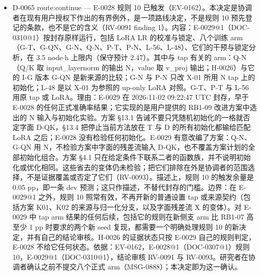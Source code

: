 \documentclass[11pt]{article}
\begin{document}
\begin{itemize}
\item D-0065 route:continue --- E-0028 规则 10 已触发（EV-0162）。本决定是协调者在现有用户授权下作出的有界例外，是一项路线决定，不是规则 10 预先登记的条款，也不是它的含义（RV-0091 finding 1）。内容：E-0029@1（DOC-0310@1）按封存原样运行，包括 LoRA LR 的校准与锁定、八个训练 arm（G-T、G-QN、G-N、Q-N、P-T、P-N、L-56、L-48）、它们的干预与锁定分析，在 3.5 node\ensuremath{\cdot}h 上限内（保守预计 2.47）。其中与 tap 有关的 arm：Q-N（Q/K 取 input\_layernorm 的输出 N，value 取 v\_proj 输出；H-0026）与它的 I-G 版本 G-QN 是新来源的比较；G-N 与 P-N 只改 X-01 所用 N tap 上的初始化；L-48 是以 X-01 为参照的 up-only LoRA 对照。G-T、P-T 与 L-56 用原 tap 或 LoRA。理由：E-0029 在 2026-11-02 09:22:47 UTC 封存，早于 E-0028 的任何正式准确率结果；它实现的是用户提供的 RB1-09 改进方案中选出的 N 输入与初始化实验。方案 §13.1 告诫不要只凭随机初始化的一格就否定字面 D-QK，§13.4 把停止当前方法放在 T 与 D 的所有初始化都输给匹配 LoRA 之后；E-0028 没有检验任何初始化。E-0029 有意改编了方案：Q-N、G-QN 用 N，不检验方案中字面的残差流输入 D-QK，也不覆盖方案计划的全部初始化组合。方案 §4.1 只在给定条件下联系二者的函数族，并不说明初始化或优化相同。这些省去的变体仍未检验；把它们排除在外是协调者的范围选择，不是证据覆盖或否定了它们（RV-0093）。描述上，规则 10 的触发余量是 0.05 pp，即一条 dev 预测；这只作描述，不替代封存的门槛。边界：在 E-0029@1 之外，规则 10 照常有效，不再开新的普通设置 tap 或来源契约（包括方案 K01、K02 的来源与归一化分支，以及字面残差流 X 的变体）。对 E-0029 中 tap arm 结果的任何后续，包括它的规则在新侧支 arm 比 RB1-07 高至少 1 pp 时要求的两个新 seed 复现，都需要一个明确处理规则 10 的新决定，并有自己的结论审核。H-0026 的证据状态只按 E-0029 自己的规则判定，E-0028 不给它任何状态。依据：EV-0162，E-0028@1（DOC-0307@1）规则 10，E-0029@1（DOC-0310@1），结论审核 RV-0091 与 RV-0093。研究者在协调者确认之前不提交八个正式 arm（MSG-0888）；本决定即为这一确认。

\end{itemize}
\end{document}
